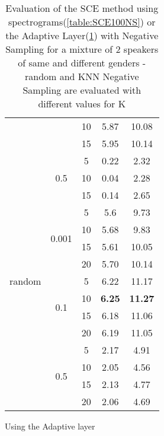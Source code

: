 \documentclass[master,final,11pt]{iscs-thesis}
\begin{document}
\begin{table}
\begin{subtable}{.5\linewidth}
\begin{tabular}{c|c|c|c|c}
\cline{3-5}
 &  & 10 & 5.87 & 10.08 \\
\cline{3-5}
 &  & 15 & 5.95 & 10.14 \\
\cline{2-5}
 & \multirow{3}{*}{0.5} & 5 & 0.22 & 2.32 \\
\cline{3-5}
 &  & 10 & 0.04 & 2.28 \\
\cline{3-5}
 &  & 15 & 0.14 & 2.65 \\
\hline
\multirow{9}{*}{random}  & \multirow{4}{*}{0.001} & 5 & 5.6 & 9.73 \\ 
\cline{3-5}
 &  & 10 & 5.68 & 9.83 \\
\cline{3-5}
 &  & 15 & 5.61 & 10.05 \\
\cline{3-5}
 &  & 20 & 5.70 & 10.14 \\
\cline{2-5}
 & \multirow{4}{*}{0.1} & 5 & 6.22 & 11.17 \\
\cline{3-5}
 &  & 10 & \textbf{6.25} & \textbf{11.27} \\
\cline{3-5}
 &  & 15 & 6.18 & 11.06 \\
\cline{3-5}
 &  & 20 & 6.19 & 11.05 \\
\cline{2-5}
 & \multirow{4}{*}{0.5} & 5 & 2.17 & 4.91 \\
\cline{3-5}
 &  & 10 & 2.05 & 4.56 \\
\cline{3-5}
 &  & 15 & 2.13 & 4.77 \\
\cline{3-5}
 &  & 20 & 2.06 & 4.69 \\
\end{tabular}
\caption{Using the Adaptive layer}
\label{table:ADAPTSCENS}
\end{subtable}
\caption{Evaluation of the SCE method using spectrograms(\ref{table:SCE100NS}) or the Adaptive Layer(\ref{table:ADAPTSCENS}) with Negative Sampling for a mixture of 2 speakers of same and different genders - random and KNN Negative Sampling are evaluated with different values for K}
\end{table}
\end{document}
